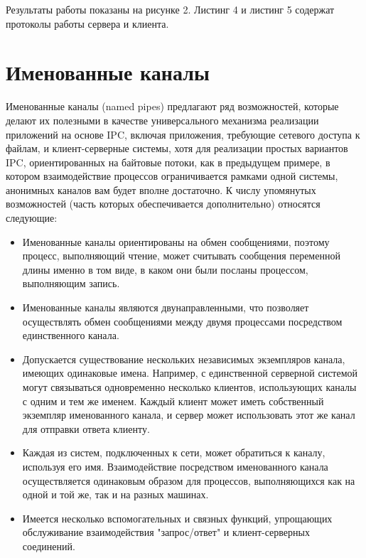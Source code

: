 \documentclass[a4paper, 12pt]{report}		%
\begin{document}
Результаты работы показаны на рисунке 2. Листинг 4 и листинг 5 содержат протоколы работы сервера и клиента.





\chapter*{Именованные каналы}

Именованные каналы (named pipes) предлагают ряд возможностей, которые делают их полезными в качестве универсального механизма реализации приложений на основе IPC, включая приложения, требующие сетевого доступа к файлам, и клиент-серверные системы, хотя для реализации простых вариантов IPC, ориентированных на байтовые потоки, как в предыдущем примере, в котором взаимодействие процессов ограничивается рамками одной системы, анонимных каналов вам будет вполне достаточно. К числу упомянутых возможностей (часть которых обеспечивается дополнительно) относятся следующие:

\begin{itemize}
\item Именованные каналы ориентированы на обмен сообщениями, поэтому процесс, выполняющий чтение, может считывать сообщения переменной длины именно в том виде, в каком они были посланы процессом, выполняющим запись.

\item Именованные каналы являются двунаправленными, что позволяет осуществлять обмен сообщениями между двумя процессами посредством единственного канала.

\item Допускается существование нескольких независимых экземпляров канала, имеющих одинаковые имена. Например, с единственной серверной системой могут связываться одновременно несколько клиентов, использующих каналы с одним и тем же именем. Каждый клиент может иметь собственный экземпляр именованного канала, и сервер может использовать этот же канал для отправки ответа клиенту.

\item Каждая из систем, подключенных к сети, может обратиться к каналу, используя его имя. Взаимодействие посредством именованного канала осуществляется одинаковым образом для процессов, выполняющихся как на одной и той же, так и на разных машинах.

\item Имеется несколько вспомогательных и связных функций, упрощающих обслуживание взаимодействия "запрос/ответ" и клиент-серверных соединений.
\end{itemize}
\end{document}

